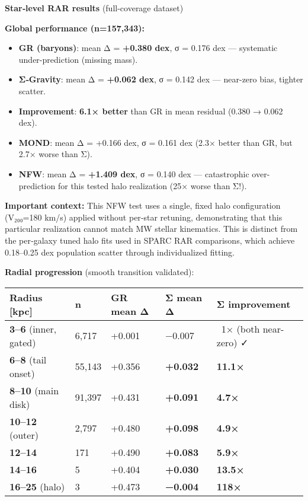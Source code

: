 \documentclass[11pt,a4paper]{article}
\begin{document}
\textbf{Star‑level RAR results} (full-coverage dataset)


\textbf{Global performance (n=157,343):}

\begin{itemize}
\item \textbf{GR (baryons)}: mean Δ = \textbf{+0.380 dex}, σ = 0.176 dex — systematic under-prediction (missing mass).
\item \textbf{Σ‑Gravity}: mean Δ = \textbf{+0.062 dex}, σ = 0.142 dex — near-zero bias, tighter scatter.
\item \textbf{Improvement}: \textbf{6.1× better} than GR in mean residual (0.380 → 0.062 dex).
\item \textbf{MOND}: mean Δ = +0.166 dex, σ = 0.161 dex (2.3× better than GR, but 2.7× worse than Σ).
\item \textbf{NFW}: mean Δ = \textbf{+1.409 dex}, σ = 0.140 dex — catastrophic over-prediction for this tested halo realization (25× worse than Σ!).
\end{itemize}


\textbf{Important context:} This NFW test uses a single, fixed halo configuration (V₂₀₀=180 km/s) applied without per‑star retuning, demonstrating that this particular realization cannot match MW stellar kinematics. This is distinct from the per‑galaxy tuned halo fits used in SPARC RAR comparisons, which achieve 0.18–0.25 dex population scatter through individualized fitting.


\textbf{Radial progression} (smooth transition validated):


\begin{table}[h]
\centering
\begin{tabular}{lllll}
\toprule
Radius [kpc] & n & GR mean Δ & Σ mean Δ & Σ improvement \\
\midrule
\textbf{3–6} (inner, gated) & 6,717 & +0.001 & −0.007 & ~1× (both near-zero) ✓ \\
\textbf{6–8} (tail onset) & 55,143 & +0.356 & \textbf{+0.032} & \textbf{11.1×} \\
\textbf{8–10} (main disk) & 91,397 & +0.431 & \textbf{+0.091} & \textbf{4.7×} \\
\textbf{10–12} (outer) & 2,797 & +0.480 & \textbf{+0.098} & \textbf{4.9×} \\
\textbf{12–14} & 171 & +0.490 & \textbf{+0.083} & \textbf{5.9×} \\
\textbf{14–16} & 5 & +0.404 & \textbf{+0.030} & \textbf{13.5×} \\
\textbf{16–25} (halo) & 3 & +0.473 & \textbf{−0.004} & \textbf{118×} \\
\bottomrule
\end{tabular}
\end{table}
\end{document}
